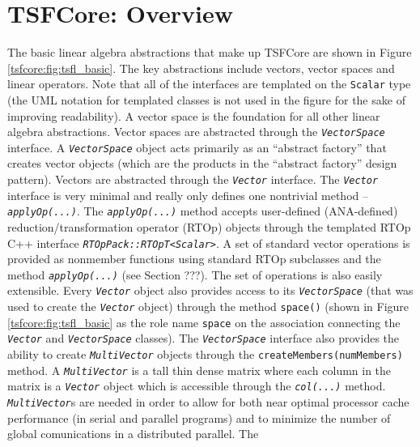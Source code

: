 \documentclass[10pt,fleqn]{article}
\begin{document}
%
\section{TSFCore: Overview}
\label{tsfcore:sec:TSFCore_core_overview}
%

The basic linear algebra abstractions that make up TSFCore are shown in
Figure \ref{tsfcore:fig:tsfl_basic}.  The key abstractions include
vectors, vector spaces and linear operators.  Note that all of the interfaces
are templated on the \texttt{Scalar} type (the UML notation for
templated classes is not used in the figure for the sake of improving
readability).  A vector space is the foundation for all other linear
algebra abstractions.  Vector spaces are abstracted through the
\texttt{\textit{VectorSpace}} interface.  A
\texttt{\textit{VectorSpace}} object acts primarily as an ``abstract
factory'' \cite{ref:gama_et_al_1995} that creates vector objects
(which are the products in the ``abstract factory'' design pattern).
Vectors are abstracted through the \texttt{\textit{Vector}} interface.
The \texttt{\textit{Vector}} interface is very minimal and really only
defines one nontrivial method -- \texttt{\textit{applyOp(...)}}.  The
\texttt{\textit{applyOp(...)}} method accepts user-defined
(ANA-defined) reduction/transformation operator (RTOp) objects through
the templated RTOp C++ interface \texttt{\textit{RTOpPack::RTOpT<Scalar>}}.
A set of standard vector operations is provided as nonmember functions
using standard RTOp subclasses and the method
\texttt{\textit{applyOp(...)}}  (see Section ???).  The set of operations
is also easily extensible.  Every \texttt{\textit{Vector}} object also
provides access to its \texttt{\textit{VectorSpace}} (that was used to
create the \texttt{\textit{Vector}} object) through the method
\texttt{space()} (shown in Figure \ref{tsfcore:fig:tsfl_basic} as the
role name \texttt{space} on the association connecting the
\texttt{\textit{Vector}} and \texttt{\textit{VectorSpace}} classes).
The \texttt{\textit{VectorSpace}} interface also provides the ability
to create \texttt{\textit{MultiVector}} objects through the
\texttt{createMembers(numMembers)} method.  A \texttt{\textit{MultiVector}}
is a tall thin dense matrix where each column in the matrix is a
\texttt{\textit{Vector}} object which is accessible through the
\texttt{\textit{col(...)}} method.  \texttt{\textit{MultiVector}}s
are needed in order to allow for both near optimal processor cache
performance (in serial and parallel programs) and to minimize the
number of global comunications in a distributed parallel.  The
\end{document}
